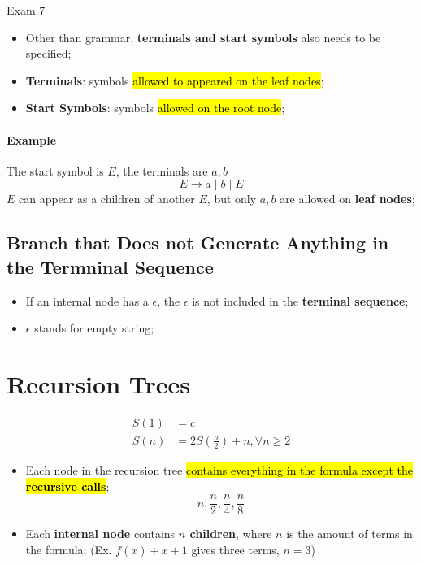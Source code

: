 \documentclass{note}
\begin{document}
\begin{note}{Exam 7}
    \begin{itemize}
        \item Other than grammar, \textbf{terminals and start symbols} also needs
        to be specified;
        \item \textbf{Terminals}: symbols \hl{allowed to appeared on the leaf nodes};
        \item \textbf{Start Symbols}: symbols \hl{allowed on the root node};
    \end{itemize}

    \paragraph{Example} The start symbol is $ E $, the terminals are $ a,b $
    \begin{displaymath}
        E \to a \mid b \mid E
    \end{displaymath}
    $ E $ can appear as a children of another $ E $, but only $ a, b $ are allowed on 
    \textbf{leaf nodes};

    \subsection{Branch that Does not Generate Anything in the Termninal Sequence}
    \begin{itemize}
        \item If an internal node has a $ \epsilon $, the $ \epsilon $ is not included
        in the \textbf{terminal sequence};
        \item $ \epsilon $ stands for empty string;
    \end{itemize}

\section{Recursion Trees}

\begin{align*}
    S(1) &= c\\ 
    S(n) &= 2 S \left( \frac{n}{2} \right) + n, \forall n \geq 2
\end{align*}

\begin{itemize}
    \item Each node in the recursion tree \hl{contains everything in the formula except 
    the \textbf{recursive calls}};
    \begin{displaymath}
        n, \frac{n}{2}, \frac{n}{4}, \frac{n}{8}
    \end{displaymath}
    \item Each \textbf{internal node} contains \textbf{$ n $ children}, where $ n $ is the amount of terms in the formula; 
    (Ex. $ f(x) + x + 1 $ gives three terms, $ n = 3 $)
\end{itemize}

\end{note}
\end{document}
